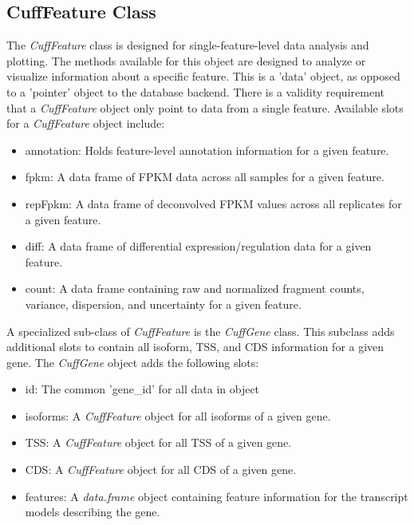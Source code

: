 \documentclass[10pt]{article}
\newcommand{\Rclass}[1]{{\textit{#1}}}
\begin{document}
\subsection{CuffFeature Class}
	The \Rclass{CuffFeature} class is designed for single-feature-level data analysis and plotting.  The methods available for this object are designed to analyze or visualize information about a specific feature.
	This is a 'data' object, as opposed to a 'pointer' object to the database backend. There is a validity requirement that a \Rclass{CuffFeature} object only point to data from a single feature.
	Available slots for a \Rclass{CuffFeature} object include:
	\begin{itemize}
		\item annotation: Holds feature-level annotation information for a given feature.
		\item fpkm: A data frame of FPKM data across all samples for a given feature.
		\item repFpkm: A data frame of deconvolved FPKM values across all replicates for a given feature.
		\item diff: A data frame of differential expression/regulation data for a given feature.
		\item count: A data frame containing raw and normalized fragment counts, variance, dispersion, and uncertainty for a given feature.
	\end{itemize}
	
	A specialized sub-class of \Rclass{CuffFeature} is the \Rclass{CuffGene} class. This subclass adds additional slots to contain all isoform, TSS, and CDS information for a given gene.
	The \Rclass{CuffGene} object adds the following slots:
	\begin{itemize}
		\item id: The common 'gene\_id' for all data in object
		\item isoforms: A \Rclass{CuffFeature} object for all isoforms of a given gene.
		\item TSS: A \Rclass{CuffFeature} object for all TSS of a given gene.
		\item CDS: A \Rclass{CuffFeature} object for all CDS of a given gene.
        \item features: A \Rclass{data.frame} object containing feature
        information for the transcript models describing the gene.
	\end{itemize}

\clearpage
\end{document}
